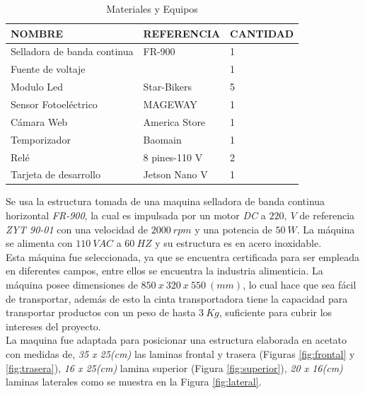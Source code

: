 \begin{table}[ht]
	\centering
	\begin{tabular}{|p{5cm}|p{3.5cm}|p{2.5cm}|}
		\hline
		NOMBRE & REFERENCIA & CANTIDAD \\ 
		\hline
		Selladora de banda continua & FR-900 & 1 \\
		\hline
		Fuente de voltaje &  & 1 \\
		\hline
		Modulo Led & Star-Bikers & 5 \\
		\hline
		Sensor Fotoeléctrico & MAGEWAY & 1 \\
		\hline
		Cámara Web & America Store & 1 \\
		\hline
		Temporizador & Baomain  & 1 \\
		\hline
		Relé & 8 pines-110 V & 2 \\
		\hline
		Tarjeta de desarrollo & Jetson Nano V & 1 \\
		\hline
	\end{tabular}	
	\caption{Materiales y Equipos}
	\label{table:materiales}
\end{table}	

Se usa la estructura tomada de una maquina selladora de banda continua horizontal \textit{FR-900}, la cual es impulsada por un motor \textit{DC} a $220, \ V$ de referencia \textit{ZYT 90-01} con una velocidad de $2000 \ rpm$ y una potencia de $50 \ W$. La máquina se alimenta con $110 \ VAC$ a $60 \ HZ$ y su estructura es en acero inoxidable.
\\
Esta máquina fue seleccionada, ya que se encuentra certificada para ser empleada en diferentes campos, entre ellos se encuentra la industria alimenticia. La máquina posee dimensiones de $850 \ x \ 320 \ x \ 550 \ (mm) $, lo cual hace que sea fácil de transportar, además de esto la cinta transportadora tiene la capacidad para transportar productos con un peso de hasta $3 \ Kg$, suficiente para cubrir los intereses del proyecto.\\

La maquina fue adaptada para posicionar una estructura elaborada en acetato con medidas de, \textit{35 x 25(cm)} las laminas frontal y trasera (Figuras \ref{fig:frontal} y \ref{fig:trasera}), \textit{16 x 25(cm)} lamina superior (Figura \ref{fig:superior}), \textit{20 x 16(cm)} laminas laterales como se muestra en la Figura \ref{fig:lateral}.\\

